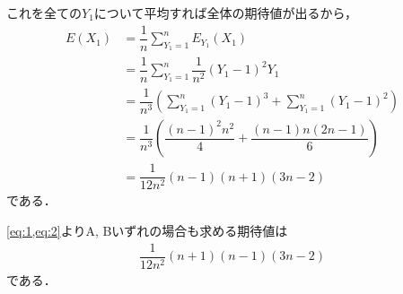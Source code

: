 \documentclass[../../main.tex]{subfiles}
\begin{document}
これを全ての$Y_1$について平均すれば全体の期待値が出るから，
\begin{align}
  E(X_1)
  &= \dfrac{1}{n}\sum_{Y_1=1}^{n}E_{Y_1}(X_1) \\
  &= \dfrac{1}{n}\sum_{Y_1=1}^{n} \dfrac{1}{n^2}(Y_1-1)^2Y_1 \\
  &= \dfrac{1}{n^3}\left(\sum_{Y_1=1}^{n} (Y_1-1)^3 + \sum_{Y_1=1}^{n}(Y_1-1)^2 \right) \\
  &= \dfrac{1}{n^3}\left(\dfrac{(n-1)^2n^2}{4}+\dfrac{(n-1)n(2n-1)}{6}\right) \\
  &= \dfrac{1}{12n^2}(n-1)(n+1)(3n-2) \label{eq:2}
\end{align}
である．

\cref{eq:1,eq:2}よりA, Bいずれの場合も求める期待値は
\begin{align}
  \dfrac{1}{12n^2}(n+1)(n-1)(3n-2)
\end{align}
である．
\end{document}
